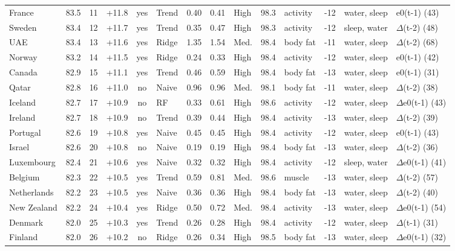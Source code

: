 {\begin{longtable}{l r r r c l r r l r l r l l}
France & 83.5 & 11 & +11.8 & yes & Trend & 0.40 & 0.41 & High & 98.3 & activity & -12 & water, sleep & e0(t-1) (43) \\
Sweden & 83.4 & 12 & +11.7 & yes & Trend & 0.35 & 0.47 & High & 98.3 & activity & -12 & sleep, water & $\Delta$(t-2) (48) \\
UAE & 83.4 & 13 & +11.6 & yes & Ridge & 1.35 & 1.54 & Med. & 98.4 & body fat & -11 & water, sleep & $\Delta$(t-2) (68) \\
Norway & 83.2 & 14 & +11.5 & yes & Ridge & 0.24 & 0.33 & High & 98.4 & activity & -12 & water, sleep & e0(t-1) (42) \\
Canada & 82.9 & 15 & +11.1 & yes & Trend & 0.46 & 0.59 & High & 98.4 & body fat & -13 & water, sleep & e0(t-1) (31) \\
Qatar & 82.8 & 16 & +11.0 & no & Naive & 0.96 & 0.96 & Med. & 98.1 & body fat & -11 & water, sleep & $\Delta$(t-2) (38) \\
Iceland & 82.7 & 17 & +10.9 & no & RF & 0.33 & 0.61 & High & 98.6 & activity & -12 & water, sleep & $\Delta$e0(t-1) (43) \\
Ireland & 82.7 & 18 & +10.9 & no & Trend & 0.39 & 0.44 & High & 98.4 & activity & -13 & water, sleep & $\Delta$(t-2) (39) \\
Portugal & 82.6 & 19 & +10.8 & yes & Naive & 0.45 & 0.45 & High & 98.4 & activity & -12 & water, sleep & e0(t-1) (43) \\
Israel & 82.6 & 20 & +10.8 & no & Naive & 0.19 & 0.19 & High & 98.4 & body fat & -13 & water, sleep & $\Delta$(t-2) (36) \\
Luxembourg & 82.4 & 21 & +10.6 & yes & Naive & 0.32 & 0.32 & High & 98.4 & activity & -12 & sleep, water & $\Delta$e0(t-1) (41) \\
Belgium & 82.3 & 22 & +10.5 & yes & Trend & 0.59 & 0.81 & Med. & 98.6 & muscle & -13 & water, sleep & $\Delta$(t-2) (57) \\
Netherlands & 82.2 & 23 & +10.5 & yes & Naive & 0.36 & 0.36 & High & 98.4 & body fat & -13 & water, sleep & $\Delta$(t-2) (40) \\
New Zealand & 82.2 & 24 & +10.4 & yes & Ridge & 0.50 & 0.72 & Med. & 98.4 & activity & -13 & water, sleep & $\Delta$e0(t-1) (54) \\
Denmark & 82.0 & 25 & +10.3 & yes & Trend & 0.26 & 0.28 & High & 98.4 & activity & -12 & water, sleep & $\Delta$(t-1) (31) \\
Finland & 82.0 & 26 & +10.2 & no & Ridge & 0.26 & 0.34 & High & 98.5 & body fat & -13 & water, sleep & $\Delta$e0(t-1) (32) \\

\end{longtable}}
